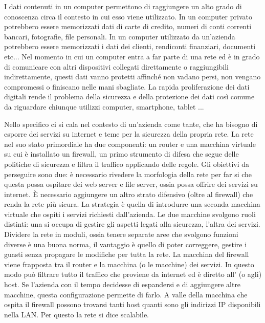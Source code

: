I dati contenuti in un computer permettono di raggiungere un alto grado di conoscenza circa il contesto in cui esso viene utilizzato. In un computer privato potrebbero essere memorizzati dati di carte di credito, numeri di conti correnti bancari, fotografie, file personali. In un computer utilizzato da un'azienda potrebbero essere memorizzati i dati dei clienti, rendiconti finanziari, documenti etc... Nel momento in cui un computer entra a far parte di una rete ed è in grado di comunicare con altri dispositivi collegati direttamente o raggiungibili indirettamente, questi dati vanno protetti affinché non vadano persi, non vengano compromessi o finiscano nelle mani sbagliate. La rapida proliferazione dei dati digitali rende il problema della sicurezza e della protezione dei dati così comune da riguardare chiunque utilizzi computer, smartphone, tablet ...

Nello specifico ci si cala nel contesto di un'azienda come tante, che ha bisogno di esporre dei servizi su internet e teme per la sicurezza della propria rete. La rete nel suo stato primordiale ha due componenti: un router e una macchina virtuale su cui è installato un firewall, un primo strumento di difesa che segue delle politiche di sicurezza e filtra il traffico applicando delle regole.
Gli obiettivi da perseguire sono due: è necessario rivedere la morfologia della rete per far si che questa possa ospitare dei web server e file server, ossia possa offrire dei servizi su internet. È necessario aggiungere un altro strato difensivo (oltre al firewall) che renda la rete più sicura.
La strategia è quella di introdurre una seconda macchina virtuale che ospiti i servizi richiesti dall'azienda. Le due macchine svolgono ruoli distinti: una si occupa di gestire gli aspetti legati alla sicurezza, l'altra dei servizi.
Dividere la rete in moduli, ossia tenere separate aree che svolgono funzioni diverse è una buona norma, il vantaggio è quello di poter correggere, gestire i guasti senza propagare le modifiche per tutta la rete.
La macchina del firewall viene frapposta tra il router e la macchina (o le macchine) dei servizi. In questo modo può filtrare tutto il traffico che proviene da internet ed è diretto all' (o agli) host.
Se l'azienda con il tempo decidesse di espandersi e di aggiungere altre macchine, questa configurazione permette di farlo. A valle della macchina che ospita il firewall possono trovarsi tanti host quanti sono gli indirizzi IP disponibili nella LAN. Per questo la rete si dice scalabile.

